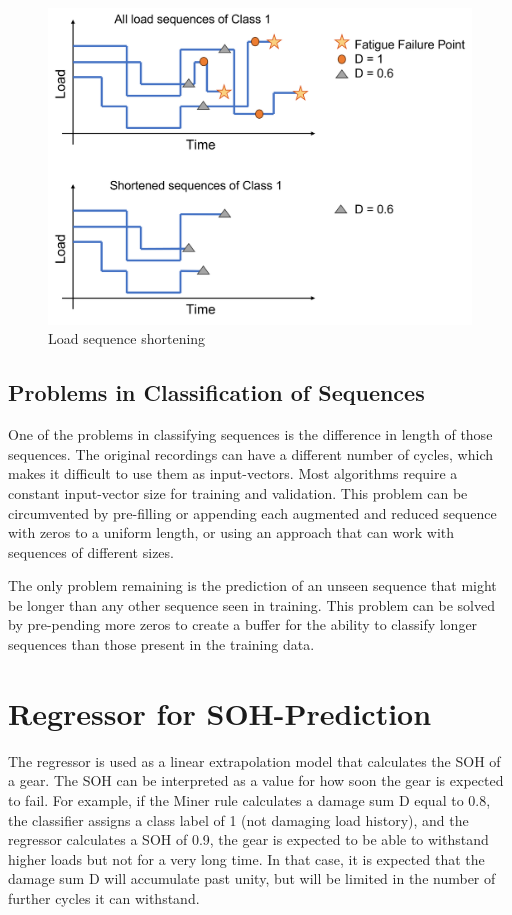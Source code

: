\begin{figure}[H]
	\centering
	\includegraphics[width=0.8\linewidth]{IMGs/Shortened.png}
	\caption{Load sequence shortening}
	\label{fig:Shortened}
\end{figure}

\subsection{Problems in Classification of Sequences}
One of the problems in classifying sequences is the difference in length of those sequences. The original recordings can have a different number of cycles, which makes it difficult to use them as input-vectors. Most algorithms require a constant input-vector size for training and validation. This problem can be circumvented by pre-filling or appending each augmented and reduced sequence with zeros to a uniform length, or using an approach that can work with sequences of different sizes. 


The only problem remaining is the prediction of an unseen sequence that might be longer than any other sequence seen in training.
This problem can be solved by pre-pending more zeros to create a buffer for the ability to classify longer sequences than those present in the training data.



\section{Regressor for SOH-Prediction}
The regressor is used as a linear extrapolation model that calculates the SOH of a gear. The SOH can be interpreted as a value for how soon the gear is expected to fail. For example, if the Miner rule calculates a damage sum D equal to 0.8, the classifier assigns a class label of 1 (not damaging load history), and the regressor calculates a SOH of 0.9, the gear is expected to be able to withstand higher loads but not for a very long time. In that case, it is expected that the damage sum D will accumulate past unity, but will be limited in the number of further cycles it can withstand. 

